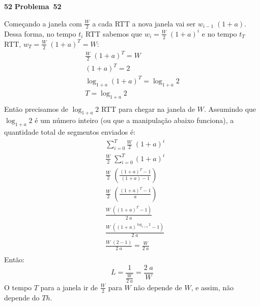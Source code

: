 \documentclass{article}
\newcounter{exe-list}
\newenvironment{exe}[2][Problema]
    {\newcommand{\opt}{(Opcional)}%
    \newcommand{\sketch}[1]{{\bfseries Rascunho:} ##1}%
    \medskip\par\noindent\ifthenelse{\equal{#1}{}}
        {\textbf{\large #2}}
        {\textbf{\large #1~#2}}%
    \medskip\par\noindent}
    {\medskip}
\begin{document}
\begin{exe}{52}
    Começando a janela com \(\frac{W}{2}\)
    a cada RTT a nova janela vai ser \(w_{i-1} \; (1+a)\).
    Dessa forma, no tempo \(t_i\) RTT sabemos que
    \(w_i = \frac{W}{2} \; (1+a)^i\) e
    no tempo \(t_T\) RTT,
    \(w_T = \frac{W}{2} \; (1+a)^T = W\):
    \begin{align*}
        \frac{W}{2} \; (1+a)^T = W \\
        (1+a)^T = 2 \\
        \log_{1+a} (1+a)^T = \log_{1+a} 2 \\
        T = \log_{1+a} 2 \\
    \end{align*}
    Então precisamos de \(\log_{1+a} 2\) RTT
    para chegar na janela de \(W\).
    Assumindo que \(\log_{1+a} 2\) é um número inteiro
    (ou que a manipulação abaixo funciona),
    a quantidade total de segmentos enviados é:
    \begin{align*}
        &\sum_{i = 0}^T \frac{W}{2} \; (1+a)^i \\
        &\frac{W}{2} \; \sum_{i = 0}^T (1+a)^i \\
        &\frac{W}{2} \; \left( \frac{(1+a)^T - 1}{(1 + a) - 1} \right) \\
        &\frac{W}{2} \; \left( \frac{(1+a)^T - 1}{a} \right) \\
        &\frac{W \; ((1+a)^T - 1)}{2 \; a} \\
        &\frac{W \; ((1+a)^{\log_{1+a} 2} - 1)}{2 \; a} \\
        &\frac{W \; (2 - 1)}{2 \; a} = \frac{W}{2 \; a} \\
    \end{align*}
    Então:
    \[
        L = \frac{1}{\frac{W}{2 \; a}}
            = \frac{2 \; a}{W}
    \]
    O tempo \(T\) para a janela ir de \(\frac{W}{2}\) para \(W\)
    não depende de \(W\), e assim,
    não depende do \(Th\).
\end{exe}
\end{document}
